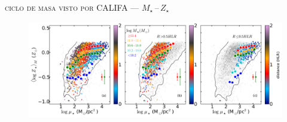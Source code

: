 \documentclass[xcolor=dvipsnames,4pt,fleqn,hyperref={colorlinks,citecolor=black,linkcolor=black,urlcolor=black}]{beamer}
\begin{document}
\begin{frame}{\textsc{ciclo de masa visto por CALIFA --- $M_\star\,$--$\,Z_\star$}}

\begin{figure}
\flushleft\citep{Gonzalez2014b}
\includegraphics[scale=0.7]{img/gonzalez2014b-3}
\end{figure}
\end{frame}
\end{document}
